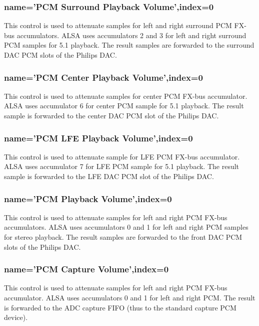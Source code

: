 \documentclass[a4paper,8pt,english]{sphinxmanual}
\begin{document}
\subsubsection{name='PCM Surround Playback Volume',index=0}
\label{sound/cards/audigy-mixer:name-pcm-surround-playback-volume-index-0}
This control is used to attenuate samples for left and right surround PCM FX-bus
accumulators. ALSA uses accumulators 2 and 3 for left and right surround PCM
samples for 5.1 playback. The result samples are forwarded to the surround DAC PCM
slots of the Philips DAC.


\subsubsection{name='PCM Center Playback Volume',index=0}
\label{sound/cards/audigy-mixer:name-pcm-center-playback-volume-index-0}
This control is used to attenuate samples for center PCM FX-bus accumulator.
ALSA uses accumulator 6 for center PCM sample for 5.1 playback. The result sample
is forwarded to the center DAC PCM slot of the Philips DAC.


\subsubsection{name='PCM LFE Playback Volume',index=0}
\label{sound/cards/audigy-mixer:name-pcm-lfe-playback-volume-index-0}
This control is used to attenuate sample for LFE PCM FX-bus accumulator.
ALSA uses accumulator 7 for LFE PCM sample for 5.1 playback. The result sample
is forwarded to the LFE DAC PCM slot of the Philips DAC.


\subsubsection{name='PCM Playback Volume',index=0}
\label{sound/cards/audigy-mixer:name-pcm-playback-volume-index-0}
This control is used to attenuate samples for left and right PCM FX-bus
accumulators. ALSA uses accumulators 0 and 1 for left and right PCM samples for
stereo playback. The result samples are forwarded to the front DAC PCM slots
of the Philips DAC.


\subsubsection{name='PCM Capture Volume',index=0}
\label{sound/cards/audigy-mixer:name-pcm-capture-volume-index-0}
This control is used to attenuate samples for left and right PCM FX-bus
accumulator. ALSA uses accumulators 0 and 1 for left and right PCM.
The result is forwarded to the ADC capture FIFO (thus to the standard capture
PCM device).
\end{document}
